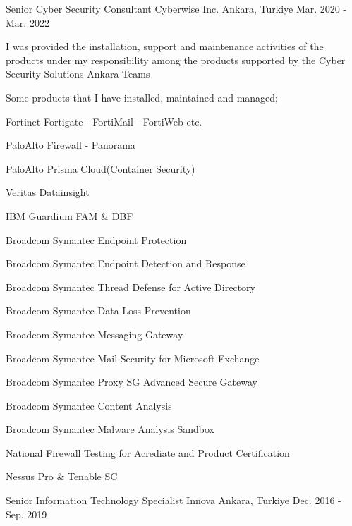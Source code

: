 \begin{cventries}
  \cventry
    {Senior Cyber Security Consultant} %
    {Cyberwise Inc.} %
    {Ankara, Turkiye} %
    {Mar. 2020 - Mar. 2022} %
    {
      \begin{cvitems} %
        \item {I was provided the installation, support and maintenance activities of the products under my responsibility among the products supported by the Cyber Security Solutions Ankara Teams}
        \item {Some products that I have installed, maintained and managed;}
        \item {Fortinet Fortigate - FortiMail - FortiWeb etc.}
        \item {PaloAlto Firewall - Panorama}
        \item {PaloAlto Prisma Cloud(Container Security)}
        \item {Veritas Datainsight}
        \item {IBM Guardium FAM \& DBF}
        \item {Broadcom Symantec Endpoint Protection}
        \item {Broadcom Symantec Endpoint Detection and Response}
        \item {Broadcom Symantec Thread Defense for Active Directory}   
        \item {Broadcom Symantec Data Loss Prevention}
        \item {Broadcom Symantec Messaging Gateway}
        \item {Broadcom Symantec Mail Security for Microsoft Exchange}
        \item {Broadcom Symantec Proxy SG Advanced Secure Gateway}
        \item {Broadcom Symantec Content Analysis}
        \item {Broadcom Symantec Malware Analysis Sandbox}
        \item {National Firewall Testing for Acrediate and Product Certification}
        \item {Nessus Pro \& Tenable SC} 
      \end{cvitems}
    }
  \cventry
    {Senior Information Technology Specialist} %
    {Innova} %
    {Ankara, Turkiye} %
    {Dec. 2016 - Sep. 2019} %
    {
      \begin{cvitems} %

\end{cvitems}}
\end{cventries}

